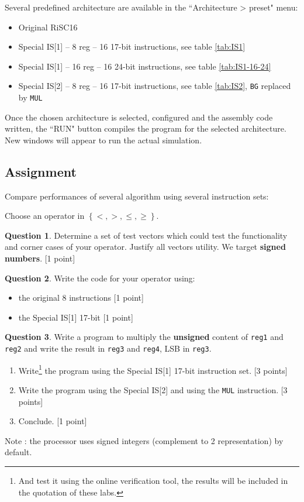\documentclass[10pt,a4paper]{article}
\theoremstyle{definition}%
\newtheorem{Q}{Question}[] %
\newcommand{\reg}[1]{\texttt{reg#1}}
\begin{document}
Several predefined architecture are available in the ``Architecture > preset" menu:
\begin{itemize}
\item Original RiSC16
\item Special IS[1] -- 8 reg -- 16 17-bit instructions, see table \vref{tab:IS1}
\item Special IS[1] -- 16 reg -- 16 24-bit instructions, see table \vref{tab:IS1-16-24}
\item Special IS[2] -- 8 reg -- 16 17-bit instructions, see table \vref{tab:IS2}, \verb!BG! replaced by \verb!MUL!
\end{itemize}

Once the chosen architecture is selected, configured and the assembly code written, the ``RUN" button compiles the program for the selected architecture. New windows will appear to run the actual simulation.

\newpage
\subsection{Assignment}

Compare performances of several algorithm using several instruction sets:

\noindent Choose an operator in $\left\lbrace <, >, \leq, \geq \right\rbrace$.

\begin{Q}
	Determine a set of test vectors which could test the functionality and corner cases of your operator. Justify all vectors utility. We target \textbf{signed numbers}.	[1 point]
\end{Q}

\begin{Q}
	Write the code for your operator using:
	\begin{itemize}
	\item the original 8 instructions [1 point]
	\item the Special IS[1] 17-bit [1 point]
	\end{itemize}
\end{Q}

\begin{Q}

Write a program to multiply the \textbf{unsigned} content of \reg{1} and \reg{2} and write the result in \reg{3} and \reg{4}, LSB in \reg{3}.
\begin{enumerate}
\item Write\footnote{\label{assign}And test it using the online verification tool, the results will be included in the quotation of these labs.} the program using the Special IS[1] 17-bit instruction set. [3 points]
\item Write the program using the Special IS[2] and using the \verb!MUL! instruction. [3 points]
\item Conclude. [1 point]
\end{enumerate}
Note : the processor uses signed integers (complement to 2 representation) by default.
\end{Q}
\end{document}
